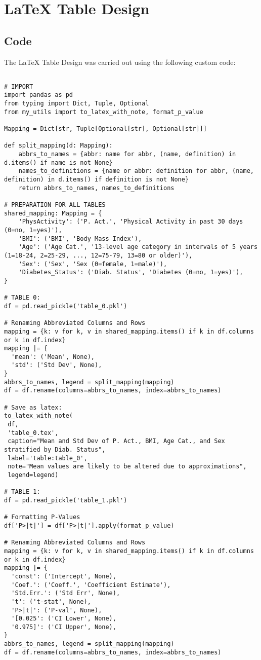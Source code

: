 \documentclass[11pt]{article}
\begin{document}
\section{LaTeX Table Design} \subsection{Code}The LaTeX Table Design was carried out using the following custom code:

\begin{verbatim}

# IMPORT
import pandas as pd
from typing import Dict, Tuple, Optional
from my_utils import to_latex_with_note, format_p_value

Mapping = Dict[str, Tuple[Optional[str], Optional[str]]]

def split_mapping(d: Mapping):
    abbrs_to_names = {abbr: name for abbr, (name, definition) in d.items() if name is not None}
    names_to_definitions = {name or abbr: definition for abbr, (name, definition) in d.items() if definition is not None}
    return abbrs_to_names, names_to_definitions

# PREPARATION FOR ALL TABLES
shared_mapping: Mapping = {
    'PhysActivity': ('P. Act.', 'Physical Activity in past 30 days (0=no, 1=yes)'),
    'BMI': ('BMI', 'Body Mass Index'),
    'Age': ('Age Cat.', '13-level age category in intervals of 5 years (1=18-24, 2=25-29, ..., 12=75-79, 13=80 or older)'),
    'Sex': ('Sex', 'Sex (0=female, 1=male)'),
    'Diabetes_Status': ('Diab. Status', 'Diabetes (0=no, 1=yes)'),
}

# TABLE 0:
df = pd.read_pickle('table_0.pkl')

# Renaming Abbreviated Columns and Rows
mapping = {k: v for k, v in shared_mapping.items() if k in df.columns or k in df.index}
mapping |= {
  'mean': ('Mean', None),
  'std': ('Std Dev', None),
}
abbrs_to_names, legend = split_mapping(mapping)
df = df.rename(columns=abbrs_to_names, index=abbrs_to_names)

# Save as latex:
to_latex_with_note(
 df, 
 'table_0.tex',
 caption="Mean and Std Dev of P. Act., BMI, Age Cat., and Sex stratified by Diab. Status", 
 label='table:table_0',
 note="Mean values are likely to be altered due to approximations",
 legend=legend)

# TABLE 1:
df = pd.read_pickle('table_1.pkl')

# Formatting P-Values
df['P>|t|'] = df['P>|t|'].apply(format_p_value)

# Renaming Abbreviated Columns and Rows
mapping = {k: v for k, v in shared_mapping.items() if k in df.columns or k in df.index}
mapping |= {
  'const': ('Intercept', None),
  'Coef.': ('Coeff.', 'Coefficient Estimate'),
  'Std.Err.': ('Std Err', None),
  't': ('t-stat', None),
  'P>|t|': ('P-val', None),
  '[0.025': ('CI Lower', None),
  '0.975]': ('CI Upper', None),
}
abbrs_to_names, legend = split_mapping(mapping)
df = df.rename(columns=abbrs_to_names, index=abbrs_to_names)


\end{verbatim}
\end{document}
